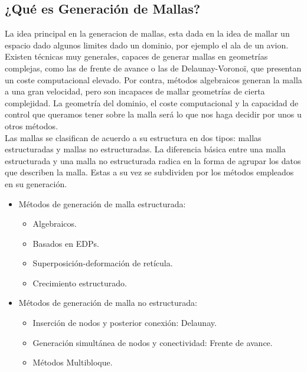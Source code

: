 \documentclass[11pt,letterpaper]{article}
\begin{document}
\subsection{¿Qué es Generación de Mallas?}

La idea principal en la generacion de mallas, esta dada en la idea de mallar un espacio dado algunos limites dado un dominio, por ejemplo el ala de un avion. Existen técnicas muy generales, capaces de generar mallas en geometrías complejas, como las de frente de avance o las de Delaunay-Voronoï, que presentan un coste computacional elevado. Por contra, métodos algebraicos generan la malla a una gran velocidad, pero son incapaces de mallar geometrías de cierta complejidad. La geometría del dominio, el coste computacional y la capacidad de control que queramos tener sobre la malla será lo que nos haga decidir por unos u otros métodos.\\

Las mallas se clasifican de acuerdo a su estructura en dos tipos: mallas estructuradas y mallas no estructuradas. La diferencia básica entre una malla estructurada y una malla no estructurada radica en la forma de agrupar los datos que describen la malla. Estas a su vez se subdividen por los métodos empleados en su generación.\\



\begin{itemize}
    \item Métodos de generación de malla estructurada:
     \begin{itemize}
         \item Algebraicos.
         \item Basados en EDPs.
         \item Superposición-deformación de retícula.
         \item Crecimiento estructurado.
    \end{itemize}
    \item Métodos de generación de malla no estructurada:
    \begin{itemize}
         \item Inserción de nodos y posterior conexión: Delaunay.
         \item Generación simultánea de nodos y conectividad: Frente de avance.
         \item Métodos Multibloque.
    \end{itemize}
\end{itemize}
\end{document}
